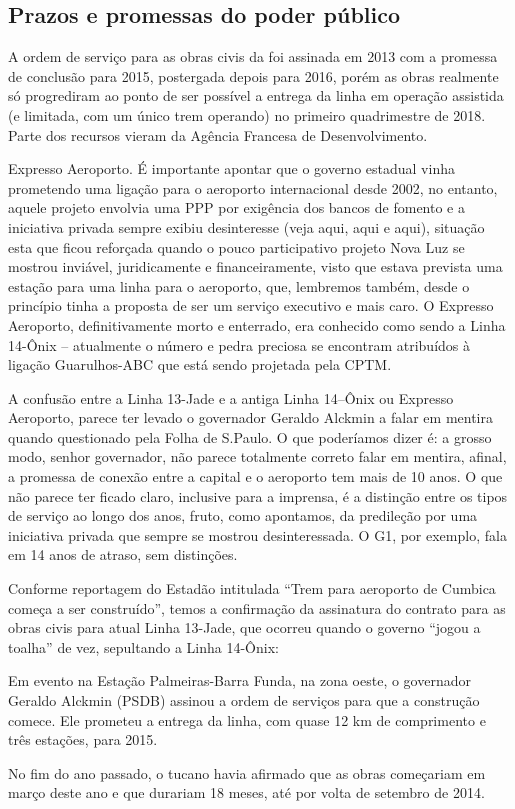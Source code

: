 \documentclass[11pt,fleqn]{book} %
\begin{document}
\subsection{Prazos e promessas do poder público}

A ordem de serviço para as obras civis da foi assinada em 2013 com a promessa de conclusão para 2015, postergada depois para 2016, porém as obras realmente só progrediram ao ponto de ser possível a entrega da linha em operação assistida (e limitada, com um único trem operando) no primeiro quadrimestre de 2018. Parte dos recursos vieram da Agência Francesa de Desenvolvimento.

Expresso Aeroporto. É importante apontar que o governo estadual vinha prometendo uma ligação para o aeroporto internacional desde 2002, no entanto, aquele projeto envolvia uma PPP por exigência dos bancos de fomento e a iniciativa privada sempre exibiu desinteresse (veja aqui, aqui e aqui), situação esta que ficou reforçada quando o pouco participativo projeto Nova Luz se mostrou inviável, juridicamente e financeiramente, visto que estava prevista uma estação para uma linha para o aeroporto, que, lembremos também, desde o princípio tinha a proposta de ser um serviço executivo e mais caro. O Expresso Aeroporto, definitivamente morto e enterrado, era conhecido como sendo a Linha 14-Ônix – atualmente o número e pedra preciosa se encontram atribuídos à ligação Guarulhos-ABC que está sendo projetada pela CPTM.

A confusão entre a Linha 13-Jade e a antiga Linha 14–Ônix ou Expresso Aeroporto, parece ter levado o governador Geraldo Alckmin a falar em mentira quando questionado pela Folha de S.Paulo. O que poderíamos dizer é: a grosso modo, senhor governador, não parece totalmente correto falar em mentira, afinal, a promessa de conexão entre a capital e o aeroporto tem mais de 10 anos. O que não parece ter ficado claro, inclusive para a imprensa, é a distinção entre os tipos de serviço ao longo dos anos, fruto, como apontamos, da predileção por uma iniciativa privada que sempre se mostrou desinteressada. O G1, por exemplo, fala em 14 anos de atraso, sem distinções.

Conforme reportagem do Estadão intitulada “Trem para aeroporto de Cumbica começa a ser construído”, temos a confirmação da assinatura do contrato para as obras civis para atual Linha 13-Jade, que ocorreu quando o governo “jogou a toalha” de vez, sepultando a Linha 14-Ônix:

\begin{citacao}
	Em evento na Estação Palmeiras-Barra Funda, na zona oeste, o governador Geraldo Alckmin (PSDB) assinou a ordem de serviços para que a construção comece. Ele prometeu a entrega da linha, com quase 12 km de comprimento e três estações, para 2015.
	
	No fim do ano passado, o tucano havia afirmado que as obras começariam em março deste ano e que durariam 18 meses, até por volta de setembro de 2014.
\end{citacao}
\end{document}
